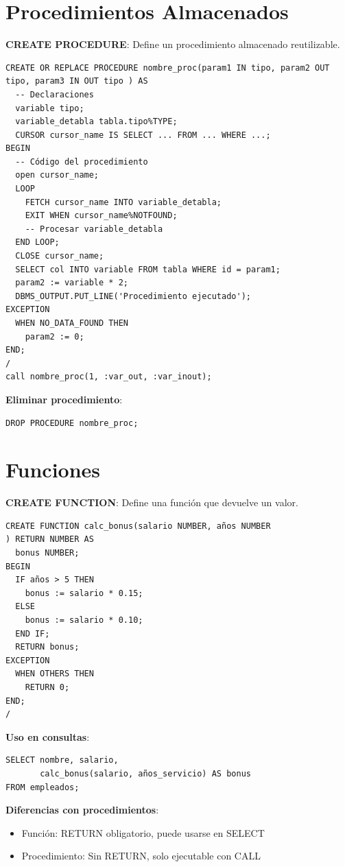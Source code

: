 \documentclass[8pt,a4paper,twocolumn]{article}
\begin{document}
\tiny

\section{Procedimientos Almacenados}

\textbf{CREATE PROCEDURE}: Define un procedimiento almacenado reutilizable.

\begin{lstlisting}
CREATE OR REPLACE PROCEDURE nombre_proc(param1 IN tipo, param2 OUT tipo, param3 IN OUT tipo ) AS
  -- Declaraciones
  variable tipo;
  variable_detabla tabla.tipo%TYPE;
  CURSOR cursor_name IS SELECT ... FROM ... WHERE ...;
BEGIN
  -- Código del procedimiento
  open cursor_name;
  LOOP
    FETCH cursor_name INTO variable_detabla;
    EXIT WHEN cursor_name%NOTFOUND;
    -- Procesar variable_detabla
  END LOOP;
  CLOSE cursor_name;
  SELECT col INTO variable FROM tabla WHERE id = param1;
  param2 := variable * 2;
  DBMS_OUTPUT.PUT_LINE('Procedimiento ejecutado');
EXCEPTION
  WHEN NO_DATA_FOUND THEN
    param2 := 0;
END;
/
call nombre_proc(1, :var_out, :var_inout);
\end{lstlisting}

\textbf{Eliminar procedimiento}:
\begin{lstlisting}
DROP PROCEDURE nombre_proc;
\end{lstlisting}

\section{Funciones}

\textbf{CREATE FUNCTION}: Define una función que devuelve un valor.

\begin{lstlisting}
CREATE FUNCTION calc_bonus(salario NUMBER, años NUMBER
) RETURN NUMBER AS
  bonus NUMBER;
BEGIN
  IF años > 5 THEN
    bonus := salario * 0.15;
  ELSE
    bonus := salario * 0.10;
  END IF;
  RETURN bonus;
EXCEPTION
  WHEN OTHERS THEN
    RETURN 0;
END;
/
\end{lstlisting}

\textbf{Uso en consultas}:
\begin{lstlisting}
SELECT nombre, salario, 
       calc_bonus(salario, años_servicio) AS bonus
FROM empleados;
\end{lstlisting}

\textbf{Diferencias con procedimientos}:
\begin{itemize}
\item Función: RETURN obligatorio, puede usarse en SELECT
\item Procedimiento: Sin RETURN, solo ejecutable con CALL
\end{itemize}
\end{document}
